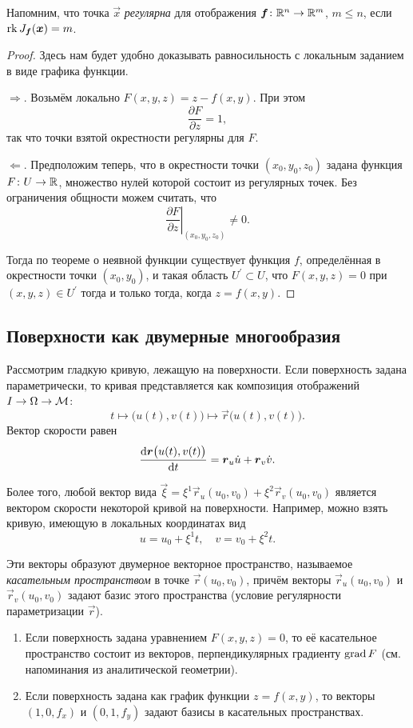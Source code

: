 \noindent
Напомним, что точка $\vec{x}$ \textit{регулярна} для отображения $\boldsymbol{f}\colon \mathbb{R}^n \to \mathbb{R}^m$, $m \leqslant n$, если $\operatorname{rk} J_{\boldsymbol{f}}(\boldsymbol{x}) = m$.

\begin{proof}
	Здесь нам будет удобно доказывать равносильность с локальным заданием в виде графика функции.

	$\Rightarrow$. Возьмём локально $F(x, y, z) = z - f(x, y)$. При этом
	\[
		\frac{\partial F}{\partial z} = 1,
	\]
	так что точки взятой окрестности регулярны для $F$.

	$\Leftarrow$. Предположим теперь, что в окрестности точки $(x_0, y_0, z_0)$ задана функция $F\colon U \to \mathbb{R}$, множество нулей которой состоит из регулярных точек. Без ограничения общности можем считать, что
	\[
		\left.\frac{\partial F}{\partial z}\right|_{(x_0, y_0, z_0)} \ne 0.
	\]

	Тогда по теореме о неявной функции существует функция $f$, определённая в окрестности точки $(x_0, y_0)$, и такая область $U^\prime \subset U$, что $F(x, y, z) = 0$ при $(x, y, z) \in U^\prime$ тогда и только тогда, когда $z = f(x, y)$.
\end{proof}

\subsection{Поверхности как двумерные многообразия}

Рассмотрим гладкую кривую, лежащую на поверхности. Если поверхность задана параметрически, то кривая представляется как композиция отображений $I \to \Omega \to \mathcal{M}$:
\[
	t \mapsto \big(u(t), v(t)\big) \mapsto \vec{r}\big(u(t), v(t)\big).
\]
Вектор скорости равен
\[
	\frac{\mathop{}\!\mathrm{d}\boldsymbol{r}\big(u(t), v(t)\big)}{\mathop{}\!\mathrm{d} t} = \boldsymbol{r}_u\dot{u} + \boldsymbol{r}_v\dot{v}.
\]

Более того, любой вектор вида $\vec{\xi} = \xi^1\vec{r}_u(u_0, v_0) + \xi^2\vec{r}_v(u_0, v_0)$ является вектором скорости некоторой кривой на поверхности. Например, можно взять кривую, имеющую в локальных координатах вид
\[
	u = u_0 + \xi^1t,\quad v = v_0 + \xi^2t.
\]

Эти векторы образуют двумерное векторное пространство, называемое \textit{касательным пространством} в точке $\vec{r}(u_0, v_0)$, причём векторы $\vec{r}_u(u_0, v_0)$ и $\vec{r}_v(u_0, v_0)$ задают базис этого пространства (условие регулярности параметризации $\vec{r}$).

\begin{example}
	\begin{enumerate}[nolistsep, label=(\arabic*)]
		\item Если поверхность задана уравнением $F(x, y, z) = 0$, то её касательное пространство состоит из векторов, перпендикулярных градиенту $\operatorname{grad} F$ (см. напоминания из аналитической геометрии).
		\item Если поверхность задана как график функции $z = f(x, y)$, то векторы $(1, 0, f_x)$ и $(0, 1, f_y)$ задают базисы в касательных пространствах.
	\end{enumerate}
\end{example}

